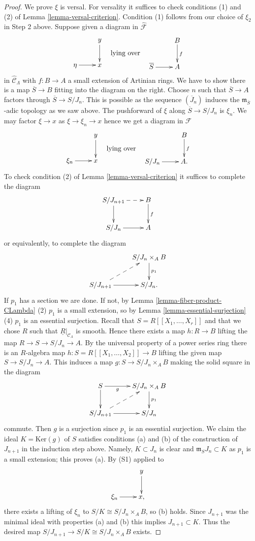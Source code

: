 \begin{proof}
\medskip \noindent
We prove $\xi$ is versal. For versality it suffices to check
conditions (1) and (2) of
Lemma \ref{lemma-versal-criterion}.
Condition (1) follows from our choice of $\xi_2$ in Step 2 above.
Suppose given a diagram in $\widehat{\mathcal{F}}$
$$
\vcenter{
\xymatrix{
            &  y \ar[d] \\
\eta \ar[r]  &  x
}
}
\quad\text{lying over}\quad
\vcenter{
\xymatrix{
         &   B  \ar[d]^{f} \\
\overline{S} \ar[r] &   A
}
}
$$
in $\widehat{\mathcal{C}}_\Lambda$ with $f: B \to A$ a small extension
of Artinian rings. We have to show there is a map $\overline{S} \to B$ fitting
into the diagram on the right. Choose $n$ such that
$\overline{S} \to A$ factors through $\overline{S} \to S/J_n$. This is
possible as the sequence $(\overline{J}_n)$ induces the
$\mathfrak m_{\overline{S}}$-adic topology as we saw above.
The pushforward of $\xi$ along $\overline{S} \to S/J_n$ is $\xi_n$.
We may factor $\xi \to x$ as $\xi \to \xi_n \to x$ hence we get a diagram
in $\mathcal{F}$
$$
\vcenter{
\xymatrix{
            &  y \ar[d] \\
\xi_n \ar[r]  &  x
}
}
\quad\text{lying over}\quad
\vcenter{
\xymatrix{
         &   B  \ar[d]^{f} \\
S/J_n \ar[r] &   A .
}
}
$$
To check condition (2) of
Lemma \ref{lemma-versal-criterion}
it suffices to complete the diagram
$$
\xymatrix{
S/J_{n + 1} \ar[d] \ar@{-->}[r] & B \ar[d]^{f} \\
S/J_n   \ar[r] & A
}
$$
or equivalently, to complete the diagram
$$
\xymatrix{
  &  S/J_n \times_A B \ar[d]^{p_1} \\
S/J_{n + 1} \ar@{-->}[ur] \ar[r] &  S/J_n.
}
$$
If $p_1$ has a section we are done. If not, by
Lemma \ref{lemma-fiber-product-CLambda} (2)
$p_1$ is a small extension, so by
Lemma \ref{lemma-essential-surjection} (4)
$p_1$ is an essential surjection. Recall that $S = R[[X_1, \ldots, X_r]]$
and that we chose $R$ such that $\underline{R}|_{\mathcal{C}_\Lambda}$
is smooth. Hence there exists a map $h : R \to B$ lifting the map
$R \to S \to S/J_n \to A$. By the universal property of a power series
ring there is an $R$-algebra map $h : S = R[[X_1, \dots, X_2]] \to B$
lifting the given map $S \to S/J_n \to A$. This induces a map
$g: S \to S/J_n \times_A B$ making the solid square in the diagram
$$
\xymatrix{
S \ar[d] \ar[r]_-g  &  S/J_n \times_A B \ar[d]^{p_1} \\
S/J_{n + 1} \ar@{-->}[ur] \ar[r] &  S/J_n
}
$$
commute. Then $g$ is a surjection since $p_1$ is an essential surjection.
We claim the ideal $K = \text{Ker}(g)$ of $S$ satisfies conditions (a) and
(b) of the construction of $J_{n + 1}$ in the induction step above.
Namely, $K \subset J_n$ is clear and $\mathfrak m_SJ_n \subset K$ as $p_1$
is a small extension; this proves (a). By (S1) applied to
$$
\xymatrix{
            &  y \ar[d] \\
\xi_n \ar[r]  &  x,
}
$$
there exists a lifting of $\xi_n$ to $S/K \cong S/J_n \times_A B$, so (b)
holds. Since $J_{n + 1}$ was the minimal ideal with properties (a) and (b)
this implies $J_{n + 1} \subset K$. Thus the desired map
$S/J_{n+1} \to S/K \cong S/J_n \times_A B$ exists.
\end{proof}
